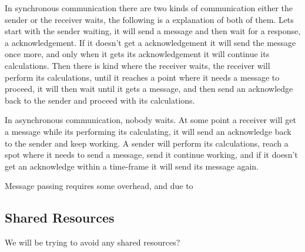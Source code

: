 In synchronous communication there are two kinds of communication either the sender or the receiver waits, the following is a explanation of both of them.
Lets start with the sender waiting, it will send a message and then wait for a response, a acknowledgement. If it doesn't get a acknowledgement it will send the message once more, and only when it gets its acknowledgement it will continue its calculations. 
Then there is kind where the receiver waits, the receiver will perform its calculations, until it reaches a point where it needs a message to proceed, it will then wait until it gets a message, and then send an acknowledge back to the sender and proceed with its calculations. 

In asynchronous communication, nobody waits. At some point a receiver will get a message while its performing its calculating, it will send an acknowledge back to the sender and keep working. A sender will perform its calculations, reach a spot where it needs to send a message, send it continue working, and if it doesn't get an acknowledge within a time-frame it will send its message again.

Message passing requires some overhead, and due to 




\subsection{\textbf{Shared Resources}} 
 We will be trying to avoid any shared resources?


